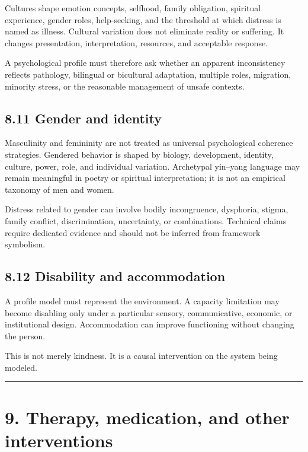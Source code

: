 \documentclass[
  11pt,
]{article}
\begin{document}
Cultures shape emotion concepts, selfhood, family obligation, spiritual
experience, gender roles, help-seeking, and the threshold at which
distress is named as illness. Cultural variation does not eliminate
reality or suffering. It changes presentation, interpretation,
resources, and acceptable response.

A psychological profile must therefore ask whether an apparent
inconsistency reflects pathology, bilingual or bicultural adaptation,
multiple roles, migration, minority stress, or the reasonable management
of unsafe contexts.

\subsection{8.11 Gender and identity}\label{gender-and-identity}

Masculinity and femininity are not treated as universal psychological
coherence strategies. Gendered behavior is shaped by biology,
development, identity, culture, power, role, and individual variation.
Archetypal yin--yang language may remain meaningful in poetry or
spiritual interpretation; it is not an empirical taxonomy of men and
women.

Distress related to gender can involve bodily incongruence, dysphoria,
stigma, family conflict, discrimination, uncertainty, or combinations.
Technical claims require dedicated evidence and should not be inferred
from framework symbolism.

\subsection{8.12 Disability and
accommodation}\label{disability-and-accommodation}

A profile model must represent the environment. A capacity limitation
may become disabling only under a particular sensory, communicative,
economic, or institutional design. Accommodation can improve functioning
without changing the person.

This is not merely kindness. It is a causal intervention on the system
being modeled.

\begin{center}\rule{0.5\linewidth}{0.5pt}\end{center}

\section{9. Therapy, medication, and other
interventions}\label{therapy-medication-and-other-interventions}
\end{document}
